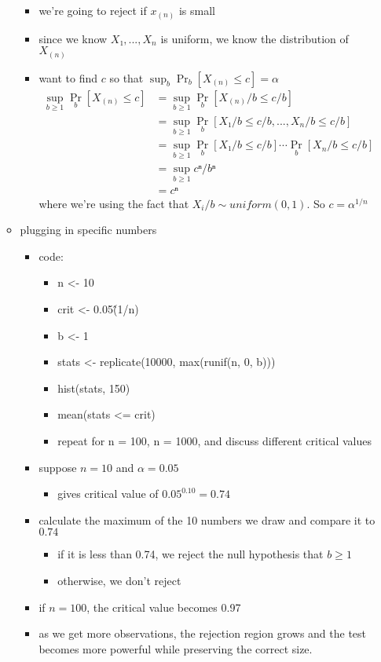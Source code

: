 \begin{itemize}
\begin{itemize}
\begin{itemize}
\item we're going to reject if $x_{(n)}$ is small
\item since we know $X₁,...,X_n$ is uniform, we know the
          distribution of $X_{(n)}$
\item want to find $c$ so that $\sup_b \Pr_b[X_{(n)} ≤ c] = α$
  \begin{align*}
    \sup_{b ≥ 1} \Pr_b[X_{(n)} ≤ c]
    &= \sup_{b≥ 1} \Pr_b[X_{(n)}/b ≤ c/b] \\
    &= \sup_{b ≥ 1} \Pr_b[X₁/b ≤ c/b, ..., X_n/b ≤ c/b] \\
    &= \sup_{b ≥ 1} \Pr_b[X₁/b ≤ c/b] ⋯ \Pr_b[X_n/b ≤ c/b] \\
    &= \sup_{b ≥ 1} cⁿ/bⁿ \\
    &= cⁿ
  \end{align*}
  where we're using the fact that $X_i/b ∼ uniform(0,1)$.  So
  $c = α^{1/n}$
\end{itemize}
\item plugging in specific numbers
\begin{itemize}
\item code:
\begin{itemize}
\item n <- 10
\item crit <- 0.05\^(1/n)
\item b <- 1
\item stats <- replicate(10000, max(runif(n, 0, b)))
\item hist(stats, 150)
\item mean(stats <= crit)
\item repeat for n = 100, n = 1000, and discuss different critical values
\end{itemize}
\item suppose $n = 10$ and $α = 0.05$
\begin{itemize}
\item gives critical value of $0.05^{0.10} = 0.74$
\end{itemize}
\item calculate the maximum of the 10 numbers we draw and
          compare it to $0.74$
\begin{itemize}
\item if it is less than 0.74, we reject the null hypothesis
            that $b ≥ 1$
\item otherwise, we don't reject
\end{itemize}
\item if $n = 100$, the critical value becomes 0.97
\item as we get more observations, the rejection region grows
          and the test becomes more powerful while preserving the
          correct size.
\end{itemize}
\end{itemize}
\end{itemize}


